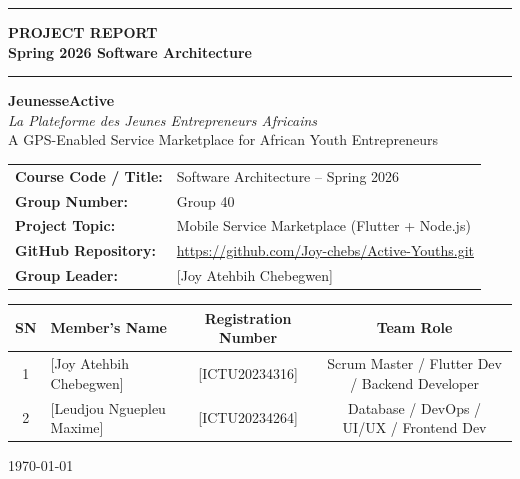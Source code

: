 \documentclass[12pt,a4paper]{report}
\begin{document}
\begin{titlepage}
\centering

\vspace*{1.5cm}
{\color{primary}\rule{\linewidth}{3pt}}
\vspace{0.5cm}

{\Huge\bfseries\color{primary} PROJECT REPORT}\\[0.5cm]
{\LARGE\bfseries Spring 2026 Software Architecture}

\vspace{0.5cm}
{\color{primary}\rule{\linewidth}{3pt}}
\vspace{1.5cm}

{\Huge\bfseries\color{accent} JeunesseActive}\\[0.4cm]
{\Large\textit{La Plateforme des Jeunes Entrepreneurs Africains}}\\[0.3cm]
{\large A GPS-Enabled Service Marketplace for African Youth Entrepreneurs}

\vspace{2cm}

\begin{tabular}{ll}
  \textbf{Course Code / Title:} & Software Architecture -- Spring 2026 \\[6pt]
  \textbf{Group Number:}        & Group 40 \\[6pt]
  \textbf{Project Topic:}       & Mobile Service Marketplace (Flutter + Node.js) \\[6pt]
  \textbf{GitHub Repository:}   & \url{https://github.com/Joy-chebs/Active-Youths.git} \\[6pt]
  \textbf{Group Leader:}        & [Joy Atehbih Chebegwen] \\
\end{tabular}

\vspace{1.5cm}

\begin{tcolorbox}[colback=primary!8, colframe=primary, title={\textbf{Group Information}}, coltitle=white]
\begin{tabularx}{\linewidth}{c X c c}
  \toprule
  \textbf{SN} & \textbf{Member's Name} & \textbf{Registration Number} & \textbf{Team Role} \\
  \midrule
  1 & [Joy Atehbih Chebegwen] & [ICTU20234316] & Scrum Master / Flutter Dev /  Backend Developer \\
  2 & [Leudjou Nguepleu Maxime] & [ICTU20234264] & Database / DevOps / UI/UX / Frontend Dev \\
  
  \bottomrule
\end{tabularx}
\end{tcolorbox}

\vfill
{\large\today}
\end{titlepage}
\end{document}
